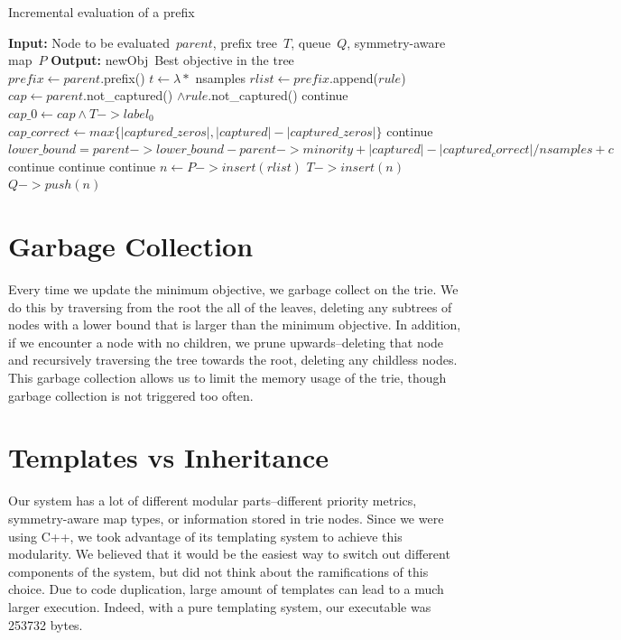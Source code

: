 \begin{algorithm}[t!]
  \caption{Incremental evaluation of a prefix}
\label{alg:incremental}
\begin{algorithmic}
\normalsize
\State \textbf{Input:} Node to be evaluated~$parent$,
prefix tree~$T$,
queue~$Q$,
symmetry-aware map~$P$
\State \textbf{Output:} newObj~Best objective in the tree\\
\State $prefix \gets parent$.prefix()
\State $t \gets \lambda *$ nsamples 
	\State $rlist \gets prefix$.append($rule$)
	\State $cap \gets parent$.not\_captured() $\wedge rule$.not\_captured()
	 
		\State continue
	\EndIf
	\State $cap\_0 \gets cap \wedge T->label_0$ 
	\State $cap\_correct \gets max\{|captured\_zeros|, |captured| - |captured\_zeros|\}$
	 
		\State continue
	\EndIf
	\State $lower\_bound = parent->lower\_bound - parent->minority + |captured| - |captured_correct| / nsamples + c$
	 
		\State continue
	\EndIf
	 
		\State continue
	\EndIf
	 
		\State continue
	\EndIf
	\State $n \gets P->insert(rlist)$ 
		\State $T->insert(n)$
		\State $Q->push(n)$
	\EndIf
\EndFor
\end{algorithmic}
\end{algorithm}

\section{Garbage Collection}
Every time we update the minimum objective, we garbage collect on the trie.
We do this by traversing from the root the all of the leaves, deleting any subtrees of nodes with a lower bound that is larger than the minimum objective.
In addition, if we encounter a node with no children, we prune upwards--deleting that node and recursively traversing the tree towards the root, deleting any childless nodes.
This garbage collection allows us to limit the memory usage of the trie, though garbage collection is not triggered too often.

\section{Templates vs Inheritance}
Our system has a lot of different modular parts--different priority metrics, symmetry-aware map types, or information stored in trie nodes.
Since we were using C++, we took advantage of its templating system to achieve this modularity.
We believed that it would be the easiest way to switch out different components of the system, but did not think about the ramifications of this choice.
Due to code duplication, large amount of templates can lead to a much larger execution.
Indeed, with a pure templating system, our executable was 253732 bytes.

